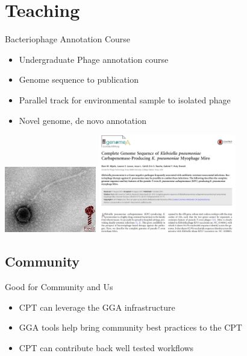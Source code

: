 \documentclass[12pt]{phage3slides} %
\begin{document}
\section{Teaching}
\begin{frame}{Bacteriophage Annotation Course}
    \begin{itemize}
        \item Undergraduate Phage annotation course
        \item Genome sequence to publication
        \item Parallel track for environmental sample to isolated phage
        \item Novel genome, de novo annotation
    \end{itemize}
    \includegraphics[width=4cm]{img/phage.png}
    \includegraphics[width=6cm]{img/pub.png}
\end{frame}

\subsection{Community}
\begin{frame}{Good for Community and Us}
    \begin{itemize}
        \item CPT can leverage the GGA infrastructure
        \item GGA tools help bring community best practices to the CPT
        \item CPT can contribute back well tested workflows
    \end{itemize}
\end{frame}
\end{document}
